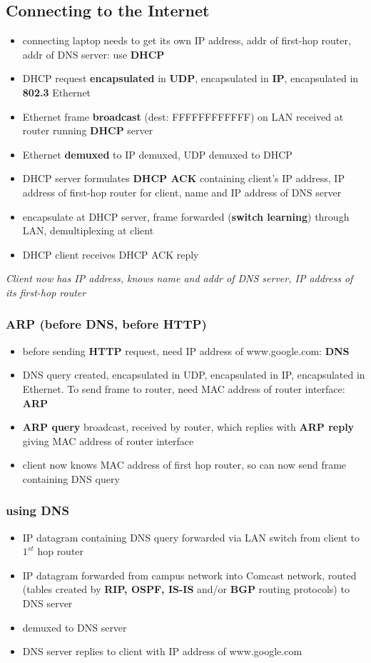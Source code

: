 \documentclass[12pt, a4paper]{article}
\begin{document}
\begin{multicols*}{2}
	\subsection{Connecting to the Internet}
	\begin{itemize}
		\item connecting laptop needs to get its own IP address, addr of first-hop router, addr of DNS server: use \textbf{DHCP}
		\item DHCP request \textbf{encapsulated} in \textbf{UDP}, encapsulated in \textbf{IP}, encapsulated in \textbf{802.3} Ethernet
		\item Ethernet frame \textbf{broadcast} (dest: FFFFFFFFFFFF) on LAN received at router running \textbf{DHCP} server
		\item Ethernet \textbf{demuxed} to IP demuxed, UDP demuxed to DHCP
		\item DHCP server formulates \textbf{DHCP ACK} containing client's IP address, IP address of first-hop router for client, name and IP address of DNS server
		\item encapsulate at DHCP server, frame forwarded (\textbf{switch learning}) through LAN, demultiplexing at client
		\item DHCP client receives DHCP ACK reply
	\end{itemize}
	\textit{Client now has IP address, knows name and addr of DNS server, IP address of its first-hop router}
	\subsubsection{ARP (before DNS, before HTTP)}
	\begin{itemize}
		\item before sending \textbf{HTTP} request, need IP address of www.google.com: \textbf{DNS}
		\item DNS query created, encapsulated in UDP, encapsulated in IP, encapsulated in Ethernet. To send frame to router, need MAC address of router interface: \textbf{ARP}
		\item\textbf{ARP query} broadcast, received by router, which replies with \textbf{ARP reply} giving MAC address of router interface
		\item client now knows MAC address of first hop router, so can now send frame containing DNS query
	\end{itemize}
	\subsubsection{using DNS}
	\begin{itemize}
		\item IP datagram containing DNS query forwarded via LAN switch from client to $1^{st}$ hop router
		\item IP datagram forwarded from campus network into Comcast network, routed (tables created by \textbf{RIP, OSPF, IS-IS} and/or \textbf{BGP} routing protocols) to DNS server
		\item demuxed to DNS server
		\item DNS server replies to client with IP address of www.google.com
	\end{itemize}

\end{multicols*}
\end{document}
